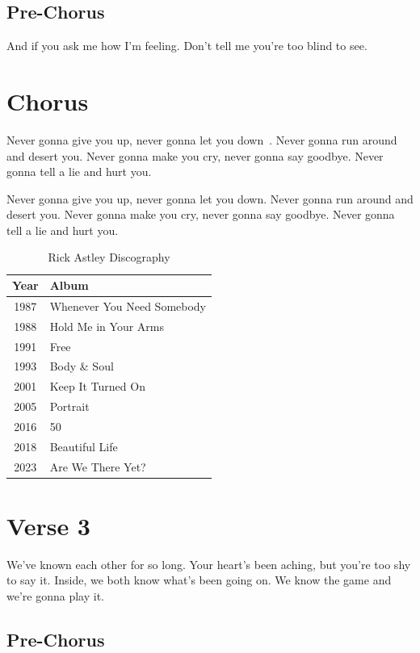 \documentclass{article}
\begin{document}
\subsection{Pre-Chorus}

And if you ask me how I'm feeling.
Don't tell me you're too blind to see.

\section{Chorus}

Never gonna give you up, never gonna let you down~\cite{badia2020never}.
Never gonna run around and desert you.
Never gonna make you cry, never gonna say goodbye.
Never gonna tell a lie and hurt you.

Never gonna give you up, never gonna let you down.
Never gonna run around and desert you.
Never gonna make you cry, never gonna say goodbye.
Never gonna tell a lie and hurt you.

\begin{table}
    \centering
    \begin{tabular}{| c | l |}
        \toprule
        Year & Album \\
        \midrule
         1987 & Whenever You Need Somebody \\
         1988 & Hold Me in Your Arms \\
         1991 & Free \\
         1993 & Body \& Soul \\
         2001 & Keep It Turned On \\
         2005 & Portrait \\
         2016 & 50 \\
         2018 & Beautiful Life \\
         2023 & Are We There Yet? \\
         \bottomrule
    \end{tabular}
    \caption{Rick Astley Discography}
    \label{tab:discography}
\end{table}

\section{Verse 3}

We've known each other for so long.
Your heart's been aching, but you're too shy to say it.
Inside, we both know what's been going on.
We know the game and we're gonna play it.

\subsection{Pre-Chorus}
\end{document}
